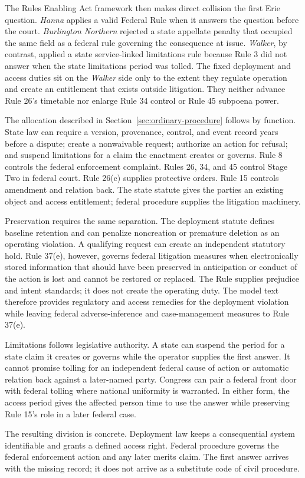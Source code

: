 The Rules Enabling Act framework then makes direct collision the first Erie question. \emph{Hanna} applies a valid Federal Rule when it answers the question before the court. \emph{Burlington Northern} rejected a state appellate penalty that occupied the same field as a federal rule governing the consequence at issue. \emph{Walker}, by contrast, applied a state service-linked limitations rule because Rule 3 did not answer when the state limitations period was tolled. The fixed deployment and access duties sit on the \emph{Walker} side only to the extent they regulate operation and create an entitlement that exists outside litigation. They neither advance Rule 26's timetable nor enlarge Rule 34 control or Rule 45 subpoena power.

The allocation described in Section~\ref{sec:ordinary-procedure} follows by function. State law can require a version, provenance, control, and event record years before a dispute; create a nonwaivable request; authorize an action for refusal; and suspend limitations for a claim the enactment creates or governs. Rule 8 controls the federal enforcement complaint. Rules 26, 34, and 45 control Stage Two in federal court. Rule 26(c) supplies protective orders. Rule 15 controls amendment and relation back. The state statute gives the parties an existing object and access entitlement; federal procedure supplies the litigation machinery.

Preservation requires the same separation. The deployment statute defines baseline retention and can penalize noncreation or premature deletion as an operating violation. A qualifying request can create an independent statutory hold. Rule 37(e), however, governs federal litigation measures when electronically stored information that should have been preserved in anticipation or conduct of the action is lost and cannot be restored or replaced. The Rule supplies prejudice and intent standards; it does not create the operating duty. The model text therefore provides regulatory and access remedies for the deployment violation while leaving federal adverse-inference and case-management measures to Rule 37(e).

Limitations follows legislative authority. A state can suspend the period for a state claim it creates or governs while the operator supplies the first answer. It cannot promise tolling for an independent federal cause of action or automatic relation back against a later-named party. Congress can pair a federal front door with federal tolling where national uniformity is warranted. In either form, the access period gives the affected person time to use the answer while preserving Rule 15's role in a later federal case.

The resulting division is concrete. Deployment law keeps a consequential system identifiable and grants a defined access right. Federal procedure governs the federal enforcement action and any later merits claim. The first answer arrives with the missing record; it does not arrive as a substitute code of civil procedure.
